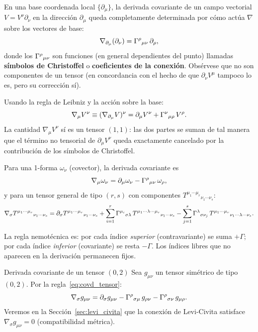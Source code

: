 En una base coordenada local $\{\partial_\mu\}$, la derivada covariante de un campo vectorial $V = V^\nu \partial_\nu$ en la dirección $\partial_\mu$ queda completamente determinada por cómo actúa $\nabla$ sobre los vectores de base:
\[
  \nabla_{\partial_\mu}(\partial_\nu) = \Gamma^{\rho}{}_{\mu \nu}\, \partial_\rho,
\]
donde los $\Gamma^{\rho}{}_{\mu \nu}$ son funciones (en general dependientes del punto) llamadas \textbf{símbolos de Christoffel} o \textbf{coeficientes de la conexión}. Obsérvese que no son componentes de un tensor (en concordancia con el hecho de que $\partial_\nu V^\mu$ tampoco lo es, pero su corrección sí).

Usando la regla de Leibniz y la acción sobre la base:
\begin{equation}
  \nabla_\mu V^\nu \equiv (\nabla_{\partial_\mu} V)^\nu
  = \partial_\mu V^\nu + \Gamma^{\nu}{}_{\mu \rho}\, V^\rho.
  \label{eq:covd_vector}
\end{equation}
La cantidad $\nabla_\mu V^\nu$ sí es un tensor $(1,1)$: las dos partes se suman de tal manera que el término no tensorial de $\partial_\mu V^\nu$ queda exactamente cancelado por la contribución de los símbolos de Christoffel.

Para una 1-forma $\omega_\nu$ (covector), la derivada covariante es
\begin{equation}
  \nabla_\mu \omega_\nu = \partial_\mu \omega_\nu - \Gamma^{\rho}{}_{\mu \nu}\, \omega_\rho,
  \label{eq:covd_covector}
\end{equation}
y para un tensor general de tipo $(r,s)$ con componentes $T^{\mu_1\cdots\mu_r}{}_{\nu_1\cdots\nu_s}$:
\begin{equation}
  \nabla_\sigma T^{\mu_1\cdots\mu_r}{}_{\nu_1\cdots\nu_s}
  = \partial_\sigma T^{\mu_1\cdots\mu_r}{}_{\nu_1\cdots\nu_s}
  + \sum_{i=1}^r \Gamma^{\mu_i}{}_{\sigma \lambda}\, T^{\mu_1\cdots\lambda\cdots\mu_r}{}_{\nu_1\cdots\nu_s}
  - \sum_{j=1}^s \Gamma^{\lambda}{}_{\sigma \nu_j}\, T^{\mu_1\cdots\mu_r}{}_{\nu_1\cdots\lambda\cdots\nu_s}.
  \label{eq:covd_tensor}
\end{equation}

\begin{importante}
La regla nemotécnica es: por cada índice \emph{superior} (contravariante) se suma $+\Gamma$; por cada índice \emph{inferior} (covariante) se resta $-\Gamma$. Los índices libres que no aparecen en la derivación permanecen fijos.
\end{importante}

\begin{ejemplo}{Derivada covariante de un tensor $(0,2)$}{}
Sea $g_{\mu\nu}$ un tensor simétrico de tipo $(0,2)$. Por la regla~\eqref{eq:covd_tensor}:
\[
  \nabla_\sigma g_{\mu\nu}
  = \partial_\sigma g_{\mu\nu}
    - \Gamma^{\rho}{}_{\sigma \mu}\, g_{\rho\nu}
    - \Gamma^{\rho}{}_{\sigma \nu}\, g_{\mu\rho}.
\]
Veremos en la Sección~\ref{sec:levi_civita} que la conexión de Levi-Civita satisface $\nabla_\sigma g_{\mu\nu} = 0$ (compatibilidad métrica).
\end{ejemplo}

